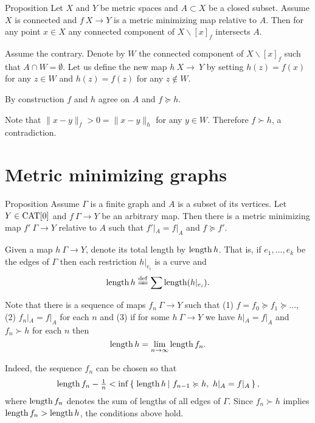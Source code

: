 \documentclass[a4paper,10pt]{amsart}
\begin{document}
\begin{thm}{Proposition}\label{prop:point-complement}
Let $X$ and $Y$ be metric spaces 
and $A\subset X$ be a closed subset.
Assume $X$ is connected and $f\:X\to Y$ is a metric minimizing map relative to $A$.
Then for any point $x\in X$ any connected component of $X\backslash [x]_f$ intersects $A$.

\end{thm}

Assume the contrary.
Denote by $W$ the connected component of $X\backslash [x]_f$ such that $A\cap W=\emptyset$.
Let us define the new map $h\:X\to\ Y$ 
by setting $h(z)=f(x)$ for any $z\in W$
and $h(z)=f(z)$ for any $z\notin W$.

By construction $f$ and $h$ agree on $A$ and $f\succcurlyeq h$.

Note that $\|x-y\|_f>0=\|x-y\|_h$ for any $y\in W$.
Therefore $f\succ h$, a contradiction.
\qeds



\section{Metric minimizing graphs}



\begin{thm}{Proposition}\label{prop:memigraph}
Assume $\Gamma$ is a  finite graph and $A$ is a subset of its vertices.
Let $Y\in\mathop{\rm CAT}\nolimits[0]$ and $f\:\Gamma\to Y$ be an arbitrary map.
Then there is a metric minimizing map $f'\:\Gamma\to Y$ relative to $A$ such that
$f'|_A=f|_A$ and 
$f\succcurlyeq f'$.
\end{thm} 

Given a map $h\:\Gamma\to Y$, denote its total length by $\mathop{\rm length}\nolimits h$.
That is, if $e_1,\dots,e_k$ be the edges of $\Gamma$ 
then each restriction $h|_{e_i}$ is a curve and
\[\length h
\df
\sum\length(h|_{e_i}).\]

Note that there is a sequence of maps $f_n\:\Gamma\to Y$
such that (1)
$f=f_0\succcurlyeq f_1\succcurlyeq\dots$, (2) $f_n|_A=f|_A$ for each $n$ and (3) if for some $h\:\Gamma\to Y$ we have $h|_A=f|_A$ and $f_n\succ h$ for each $n$ then 
\[\mathop{\rm length}\nolimits h=\lim_{n\to\infty}\mathop{\rm length}\nolimits f_n.\]

Indeed, the sequence $f_n$ can be chosen so that
\[\length f_n-\tfrac1n
<
\inf\set{\length h}{f_{n-1}\succcurlyeq h,\ h|_A=f|_A},\]
where $\mathop{\rm length}\nolimits f_n$ denotes the sum of lengths of all edges of $\Gamma$. %
Since $f_n\succ h$ implies $\mathop{\rm length}\nolimits f_n>\mathop{\rm length}\nolimits h$, 
the conditions above hold.
\end{document}
